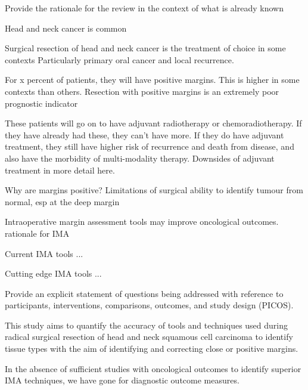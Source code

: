 
Provide the rationale for the review in the context of what is already known

Head and neck cancer is common

Surgical resection of head and neck cancer is the treatment of choice in some contexts
Particularly primary oral cancer and local recurrence.

For x percent of patients, they will have positive margins. 
This is higher in some contexts than others.
Resection with positive margins is an extremely poor prognostic indicator

These patients will go on to have adjuvant radiotherapy or chemoradiotherapy.
If they have already had these, they can't have more.
If they do have adjuvant treatment, they still have higher risk of recurrence and death from disease, and also have the morbidity of multi-modality therapy.
Downsides of adjuvant treatment in more detail here.

Why are margins positive?
Limitations of surgical ability to identify tumour from normal, esp at the deep margin



Intraoperative margin assessment tools may improve oncological outcomes.
rationale for IMA

Current IMA tools
...

Cutting edge IMA tools
...



Provide an explicit statement of questions being addressed with reference to participants, interventions, comparisons, outcomes, and study design (PICOS). 

This study aims to quantify the accuracy of tools and techniques used during radical surgical resection of head and neck squamous cell carcinoma to identify tissue types with the aim of identifying and correcting close or positive margins.


In the absence of sufficient studies with oncological outcomes to identify superior IMA techniques, we have gone for diagnostic outcome measures.
